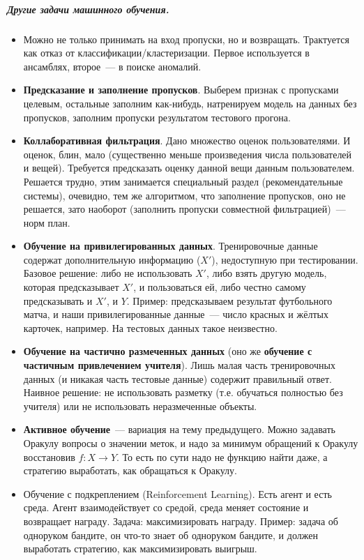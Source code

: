 \documentclass{article}
\begin{document}
    \subparagraph{Другие задачи машинного обучения.}
    \begin{itemize}
        \item Можно не только принимать на вход пропуски, но и возвращать. Трактуется как отказ от классификации/кластеризации. Первое используется в ансамблях, второе~--- в поиске аномалий.
        \item \textbf{Предсказание и заполнение пропусков}. Выберем признак с пропусками целевым, остальные заполним как-нибудь, натренируем модель на данных без пропусков, заполним пропуски результатом тестового прогона.
        \item \textbf{Коллаборативная фильтрация}. Дано множество оценок пользователями. И оценок, блин, мало (существенно меньше произведения числа пользователей и вещей). Требуется предсказать оценку данной вещи данным пользователем. Решается трудно, этим занимается специальный раздел (рекомендательные системы), очевидно, тем же алгоритмом, что заполнение пропусков, оно не решается, зато наоборот (заполнить пропуски совместной фильтрацией)~--- норм план.
        \item \textbf{Обучение на привилегированных данных}. Тренировочные данные содержат дополнительную информацию ($X'$), недоступную при тестировании. Базовое решение: либо не использовать $X'$, либо взять другую модель, которая предсказывает $X'$, и пользоваться ей, либо честно самому предсказывать и $X'$, и $Y$. Пример: предсказываем результат футбольного матча, и наши привилегированные данные~--- число красных и жёлтых карточек, например. На тестовых данных такое неизвестно.
        \item \textbf{Обучение на частично размеченных данных} (оно же \textbf{обучение с частичным привлечением учителя}). Лишь малая часть тренировочных данных (и никакая часть тестовые данные) содержит правильный ответ. Наивное решение: не использовать разметку (т.е. обучаться полностью без учителя) или не использовать неразмеченные объекты.
        \item \textbf{Активное обучение}~--- вариация на тему предыдущего. Можно задавать Оракулу вопросы о значении меток, и надо за минимум обращений к Оракулу восстановив $f\colon X\to Y$. То есть по сути надо не функцию найти даже, а стратегию выработать, как обращаться к Оракулу.
        \item Обучение с подкреплением (Reinforcement Learning). Есть агент и есть среда. Агент взаимодействует со средой, среда меняет состояние и возвращает награду. Задача: максимизировать награду. Пример: задача об одноруком бандите, он что-то знает об одноруком бандите, и должен выработать стратегию, как максимизировать выигрыш.
    \end{itemize}
\end{document}
